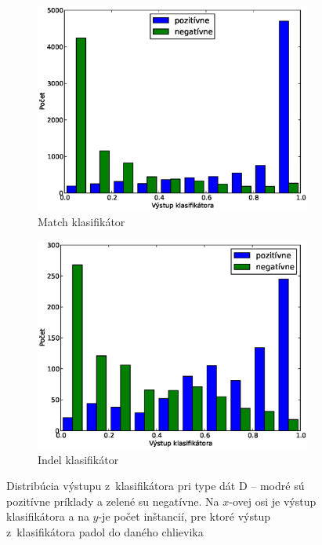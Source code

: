 \begin{figure}[htbp]
        \centering
        \begin{subfigure}[t]{0.4\textwidth}
                \includegraphics[width=\textwidth]{images/clf_fi/randomforest_combined_5_test}
                \caption{Match klasifikátor}
                \label{fig:datatype4-out-m}
        \end{subfigure}%
        \qquad\qquad %
        \begin{subfigure}[t]{0.4\textwidth}
                \includegraphics[width=\textwidth]{images/clf_fi/randomforest_combined_5_indel_test}
                \caption{Indel klasifikátor}
                \label{fig:datatype4-out-i}
        \end{subfigure}
        \caption[Distribúcia výstupu z~klasifikátora pri type D]{Distribúcia výstupu z~klasifikátora pri type dát D -- modré sú pozitívne príklady a zelené su negatívne. Na $x$-ovej osi je výstup klasifikátora a na $y$-je počet inštancií, pre ktoré výstup z~klasifikátora padol do daného chlievika}
        \label{fig:datatype4-out}
\end{figure}

